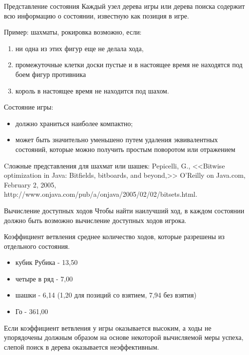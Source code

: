 \documentclass{beamer}
\begin{document}
\begin{frame}{Представление состояния}
Каждый узел дерева игры или дерева поиска содержит всю информацию о состоянии, известную как позиция в игре.

Пример: шахматы, рокировка возможно, если:
\begin{enumerate}
\item ни одна из этих фигур еще не делала хода, 
\item промежуточные клетки доски пустые и в настоящее время не находятся под боем фигур противника 
\item король в настоящее время не находится под шахом. 
\end{enumerate}

Состояние игры:
\begin{itemize}
\item должно храниться наиболее компактно;
\item может быть значительно уменьшено путем удаления эквивалентных состояний, которые можно получить простым поворотом или отражением
\end{itemize}
Cложные представления для шахмат или шашек: 
Pepicelli, G., <<Bitwise optimization in Java: Bitfields, bitboards, and beyond,>> O’Reilly on Java.com, February 2, 2005, http://www.onjava.com/pub/a/onjava/2005/02/02/bitsets.html.
\end{frame}

\begin{frame}{Вычисление доступных ходов}
Чтобы найти наилучший ход, в каждом состоянии должно быть возможно вычисление доступных ходов игрока.
\begin{block}{Коэффициент ветвления}
среднее количество ходов, которые разрешены из отдельного состояния.
\end{block}
\begin{itemize}
\item кубик Рубика - 13,50
\item четыре в ряд - 7,00
\item шашки - 6,14 (1,20 для позиций со взятием, 7,94 без взятия)
\item Го - 361,00
\end{itemize}
Если коэффициент ветвления у игры оказывается высоким, а ходы не упорядочены должным образом на основе некоторой вычисляемой меры успеха, слепой поиск
в дерева оказывается неэффективным.
\end{frame}
\end{document}
